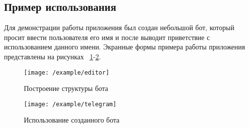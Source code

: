 
\newpage

\subsection{Пример использования}


Для демонстрации работы приложения был создан небольшой бот, который
просит ввести пользователя его имя и после выводит приветствие с использованием
данного имени.
Экранные формы примера работы приложения представлены на рисунках~
\ref{f:example:editor}-\ref{f:example:telegram}.

\begin{figure}[ht]
	\centering
	\texttt{[image: /example/editor]}
	\caption{Построение структуры бота}
	\label{f:example:editor}
\end{figure}

\begin{figure}[ht]
	\centering
	\texttt{[image: /example/telegram]}
	\caption{Использование созданного бота}
	\label{f:example:telegram}
\end{figure}


